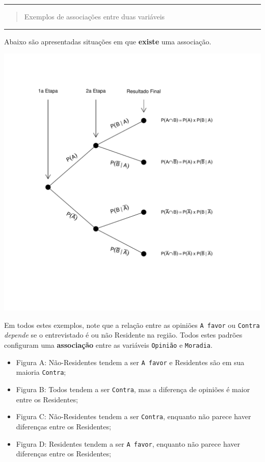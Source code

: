 \documentclass[
]{book}
\begin{document}
\begin{center}\rule{0.5\linewidth}{0.5pt}\end{center}

\begin{quote}
Exemplos de associações entre duas variáveis
\end{quote}

\begin{center}\rule{0.5\linewidth}{0.5pt}\end{center}

Abaixo são apresentadas situações em que \textbf{existe} uma associação.

\includegraphics{probest-cambientais_files/figure-latex/unnamed-chunk-191-1.pdf}

Em todos estes exemplos, note que a relação entre as opiniões \texttt{A\ favor} ou \texttt{Contra} \emph{depende} se o entrevistado é ou não Residente na região. Todos estes padrões configuram uma \textbf{associação} entre as variáveis \texttt{Opinião} e \texttt{Moradia}.

\begin{itemize}
\item
  Figura A: Não-Residentes tendem a ser \texttt{A\ favor} e Residentes são em sua maioria \texttt{Contra};
\item
  Figura B: Todos tendem a ser \texttt{Contra}, mas a diferença de opiniões é maior entre os Residentes;
\item
  Figura C: Não-Residentes tendem a ser \texttt{Contra}, enquanto não parece haver diferenças entre os Residentes;
\item
  Figura D: Residentes tendem a ser \texttt{A\ favor}, enquanto não parece haver diferenças entre os Residentes;
\end{itemize}
\end{document}
